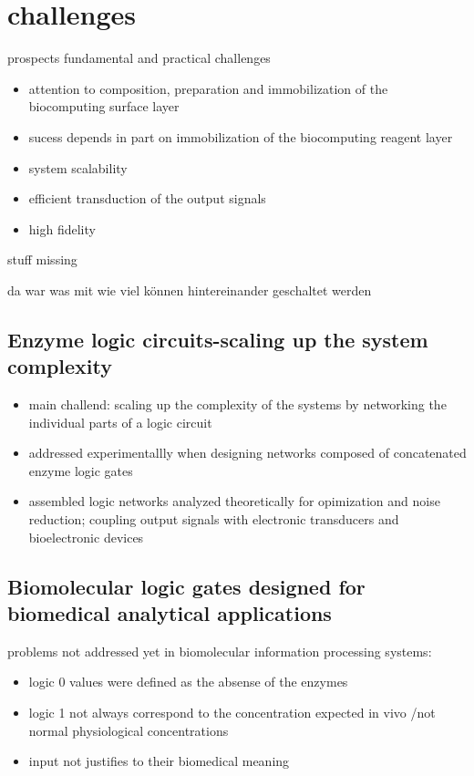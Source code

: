 \documentclass[runningheads]{llncs}
\begin{document}
\section{challenges}
	prospects
	fundamental and practical challenges
	
	\begin{itemize}
		\item attention to composition, preparation and immobilization of the biocomputing surface layer
		\item sucess depends in part on immobilization of the biocomputing reagent layer
		\item system scalability 
		\item efficient transduction of the output signals
		\item high fidelity
	\end{itemize}
	stuff missing
	
	
	da war was mit wie viel können hintereinander geschaltet werden
	


\subsection{Enzyme logic circuits-scaling up the system complexity}
	\begin{itemize}
		\item main challend: scaling up the complexity of the systems by networking the individual parts of a logic circuit 
		\item addressed experimentallly when designing networks composed of concatenated enzyme logic gates
		\item assembled logic networks analyzed theoretically for opimization and noise reduction; coupling output signals with electronic transducers and bioelectronic devices
	\end{itemize}


\subsection{Biomolecular logic gates designed for biomedical analytical applications}
	problems not addressed yet in biomolecular information processing systems:
	\begin{itemize}
		\item logic 0 values were defined as the absense of the enzymes
		\item logic 1 not always correspond to the concentration expected in vivo /not normal physiological concentrations 
		\item input not justifies to their biomedical meaning
		
	\end{itemize}
\end{document}

